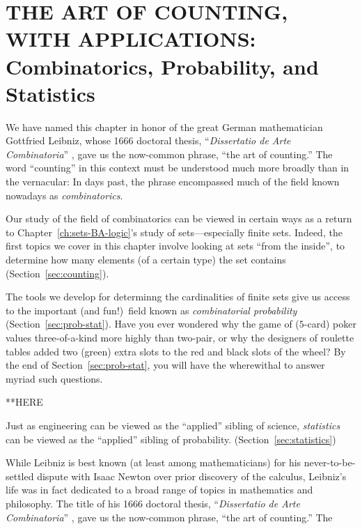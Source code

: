 
\chapter{THE ART OF COUNTING, WITH APPLICATIONS: \\
Combinatorics, Probability, and Statistics}
\label{ch:prob-stat}
\label{ch:combinatorics}

We have named this chapter in honor of the great German mathematician
Gottfried Leibniz,  whose
1666 doctoral thesis, ``{\it Dissertatio de Arte Combinatoria}''
\cite{Leibnitz}, gave us the now-common phrase, ``the art of
counting.''  The word ``counting'' in this context must be understood
much more broadly than in the vernacular: In days past, the phrase
encompassed much of the field known nowadays as {\it
  combinatorics}. 

Our study of the field of combinatorics can be viewed in certain ways
as a return to Chapter~\ref{ch:sets-BA-logic}'s study of
sets---especially finite sets.  Indeed, the first topics we cover in
this chapter involve looking at sets ``from the inside'', to determine
how many elements (of a certain type) the set contains
(Section~\ref{sec:counting}).

The tools we develop for determinng the cardinalities of finite sets
give us access to the important (and fun!)~field known as {\em
  combinatorial probability} 
(Section~\ref{sec:prob-stat}).  Have you ever wondered why the game of
($5$-card) poker values three-of-a-kind more highly than two-pair, or
why the designers of roulette tables added two (green) extra slots to
the red and black slots of the wheel?  By the end of
Section~\ref{sec:prob-stat}, you will have the wherewithal to answer
myriad such questions.

 **HERE

Just as engineering can be viewed as the ``applied'' sibling of
science, {\it statistics} can be viewed as the ``applied'' sibling of
probability.  (Section~\ref{sec:statistics})


While
Leibniz is best known (at least among mathematicians) for his
never-to-be-settled dispute with Isaac Newton 
over prior discovery of the calculus, Leibniz's life was in fact
dedicated to a broad range of topics in mathematics and philosophy.
The title of his 1666 doctoral thesis, ``{\it Dissertatio de Arte
  Combinatoria}'' \cite{Leibnitz}, gave us the now-common phrase,
``the art of counting.''  The 

